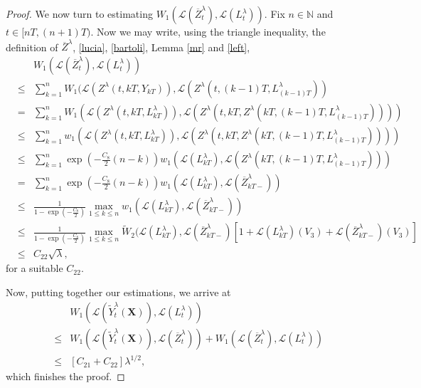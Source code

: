 \documentclass[a4paper,draft]{article}
\begin{document}
\begin{proof}
We now turn to estimating $W_1(\mathcal{L}(\overline{Z}^{\lambda}_t),\mathcal{L}(L^{\lambda}_t))$. 
Fix $n\in\mathbb{N}$ and $t\in [nT,(n+1)T)$. Now we may write, using
the triangle inequality, the definition of $\overline{Z}^{\lambda}$, \eqref{lucia}, \eqref{bartoli},
Lemma \ref{mr} and \eqref{left},
\begin{eqnarray*}
& & W_1(\mathcal{L}(\overline{Z}^{\lambda}_t),\mathcal{L}(L^{\lambda}_t))
\\ &\leq&
\sum_{k=1}^n W_1(\mathcal{L}(Z^{\lambda}(t,kT,Y_{kT})),
\mathcal{L}(Z^{\lambda}(t,(k-1)T,L^{\lambda}_{(k-1)T}))\\ &=&
\sum_{k=1}^n W_1(\mathcal{L}(Z^{\lambda}(t,kT,L^{\lambda}_{kT})),
\mathcal{L}(Z^{\lambda}(t,kT,Z^{\lambda}(kT,(k-1)T,L^{\lambda}_{(k-1)T}))))
\\ &\leq &
\sum_{k=1}^n w_{1}(\mathcal{L}(Z^{\lambda}(t,kT,L^{\lambda}_{kT})),
\mathcal{L}(Z^{\lambda}(t,kT,Z^{\lambda}(kT,(k-1)T,L^{\lambda}_{(k-1)T}))))
\\ &\leq &
\sum_{k=1}^n \exp\left(-\frac{C_8}{2}(n-k)\right)
w_{1}(\mathcal{L}(L^{\lambda}_{kT}),\mathcal{L}(Z^{\lambda}(kT,(k-1)T,L^{\lambda}_{(k-1)T})))\\ 
&=&
\sum_{k=1}^n \exp\left(-\frac{C_8}{2}(n-k)\right)
w_{1}(\mathcal{L}(L^{\lambda}_{kT}),\mathcal{L}(\overline{Z}^{\lambda}_{kT-}))\\ 
&\leq&
\frac{1}{1-\exp\left(-\frac{C_8}{2}\right)}\max_{1\leq k\leq n}
w_{1}(\mathcal{L}(L^{\lambda}_{kT}),\mathcal{L}(\overline{Z}^{\lambda}_{kT-}))\\ 
&\leq &
\frac{1}{1-\exp\left(-\frac{C_8}{2}\right)}
\max_{1\leq k\leq n}
\tilde{W}_{2}(\mathcal{L}(L^{\lambda}_{kT}),\mathcal{L}(\overline{Z}^{\lambda}_{kT-})
[1+ \mathcal{L}(L^{\lambda}_{kT})(V_{3})+\mathcal{L}(\overline{Z}^{\lambda}_{kT-})(V_{3})]
\\
&\leq&  C_{22}\sqrt{\lambda},
\end{eqnarray*}
for a suitable $C_{22}$. 

Now, putting together our estimations,
we arrive at
\begin{eqnarray*}
& & W_1(\mathcal{L}(\tilde{Y}^{\lambda}_t(\mathbf{X})),\mathcal{L}(L^{\lambda}_t))\\
&\leq& 
W_1(\mathcal{L}(\tilde{Y}^{\lambda}_t(\mathbf{X})),\mathcal{L}(\overline{Z}^{\lambda}_t))+ 
W_1(\mathcal{L}(\overline{Z}^{\lambda}_t),\mathcal{L}(L^{\lambda}_t))\\
&\leq& [C_{21}+C_{22}]\lambda^{1/2},
\end{eqnarray*}
which finishes the proof.
\end{proof}
\end{document}
